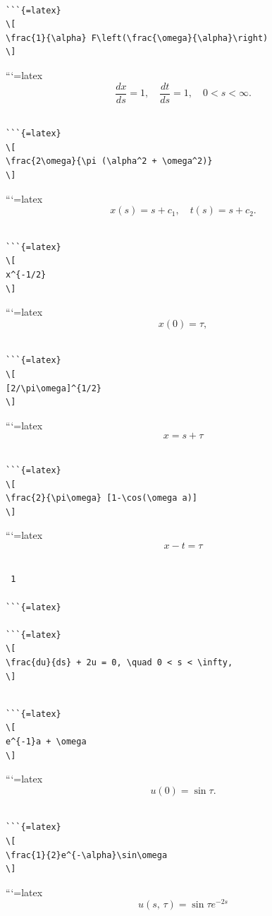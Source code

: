 \documentclass[
]{article}
\begin{document}
\begin{verbatim}

```{=latex}
\[
\frac{1}{\alpha} F\left(\frac{\omega}{\alpha}\right)
\]
\end{verbatim}

```{=latex}
\[
\frac{dx}{ds} = 1, \quad \frac{dt}{ds} = 1, \quad 0 < s < \infty.
\]

\begin{verbatim}

```{=latex}
\[
\frac{2\omega}{\pi (\alpha^2 + \omega^2)}
\]
\end{verbatim}

```{=latex}
\[
x(s) = s + c_1, \quad t(s) = s + c_2.
\]

\begin{verbatim}

```{=latex}
\[
x^{-1/2}
\]
\end{verbatim}

```{=latex}
\[
x(0) = \tau,
\]

\begin{verbatim}

```{=latex}
\[
[2/\pi\omega]^{1/2}
\]
\end{verbatim}

```{=latex}
\[
x = s + \tau
\]

\begin{verbatim}

```{=latex}
\[
\frac{2}{\pi\omega} [1-\cos(\omega a)]
\]
\end{verbatim}

```{=latex}
\[
x-t=\tau
\]

\begin{verbatim}

 1

```{=latex}

```{=latex}
\[
\frac{du}{ds} + 2u = 0, \quad 0 < s < \infty,
\]
\end{verbatim}

\begin{verbatim}

```{=latex}
\[
e^{-1}a + \omega
\]
\end{verbatim}

```{=latex}
\[
u(0) = \sin \tau.
\]

\begin{verbatim}

```{=latex}
\[
\frac{1}{2}e^{-\alpha}\sin\omega
\]
\end{verbatim}

```{=latex}
\[
u\left(s,\,\tau\right)=\sin\tau e^{-2s}
\]
\end{document}
